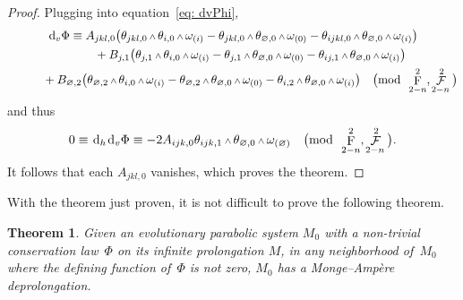 \documentclass[10pt,a4paper]{amsart}
\renewcommand{\d}{{\rm d}}
\renewcommand{\mod}[1]{\quad\big(\mathrm{mod\enspace} #1\big)}
\newcommand{\w}{{\mathchoice{\,{\scriptstyle\wedge}\,}{{\scriptstyle\wedge}}
 {{\scriptscriptstyle\wedge}}{{\scriptscriptstyle\wedge}}}}
\newcommand{\thetas}[1]{\theta_{#1}}
\newcommand{\thetanot}{\thetas{\varnothing,0}}
\newcommand{\omegas}[1]{\omega_{(#1)}}
\DeclareMathOperator{\pwf}{F}
\DeclareMathOperator{\swf}{\mathcal{F}}
\renewcommand{\dh}{\ensuremath{\hspace{1pt} \d_h}}
\newcommand{\dv}{\ensuremath{\hspace{1pt} \d_v}}
\numberwithin{equation}{section}
\newtheorem{Theorem}{Theorem}[section]
\begin{document}
\begin{proof}
 Plugging into equation~\eqref{eq: dvPhi},
 \begin{gather*}
 \dv\Phi \equiv A_{jkl,0}\big(\thetas{jkl,0}\w\thetas{i,0}\w\omegas{i} - \thetas{jkl,0}\w\thetanot\w\omegas{0} - \thetas{ijkl,0}\w\thetas{\varnothing,0}\w\omegas{i}\big)
 \\ \hphantom{\dv\Phi \equiv}
{} + B_{j,1}\big(\thetas{j,1}\w\thetas{i,0}\w\omegas{i} - \thetas{j,1}\w\thetanot\w\omegas{0} - \thetas{ij,1}\w\thetas{\varnothing,0}\w\omegas{i}\big)
\\ \hphantom{\dv\Phi \equiv}
{} + B_{\varnothing,2}\big(\thetas{\varnothing,2}\w\thetas{i,0}\w\omegas{i} - \thetas{\varnothing,2}\w\thetanot\w\omegas{0} - \thetas{i,2}\w\thetas{\varnothing,0}\w\omegas{i}\big)
 \mod{\pwf^2_{2-n}, \swf^2_{2-n}}
 \end{gather*}
 and thus
 \begin{gather*}
 0 \equiv \dh\dv\Phi \equiv -2A_{ijk,0}\thetas{ijk,1}\w\thetanot\w\omegas{\varnothing} \mod{\pwf^2_{2-n}, \swf^2_{2-n}} .
 \end{gather*}
 It follows that each $A_{jkl,0}$ vanishes, which proves the theorem.
\end{proof}

With the theorem just proven, it is not difficult to prove the following theorem.

\begin{Theorem}\label{thm:parabolics with conservation laws are MA}
 Given an evolutionary parabolic system $M_0$ with a non-trivial conservation law~$\Phi$ on its infinite prolongation $M$, in any neighborhood of~$M_0$ where the defining function of~$\Phi$ is not zero, $M_0$ has a Monge--Amp\`ere deprolongation.
\end{Theorem}
\end{document}
